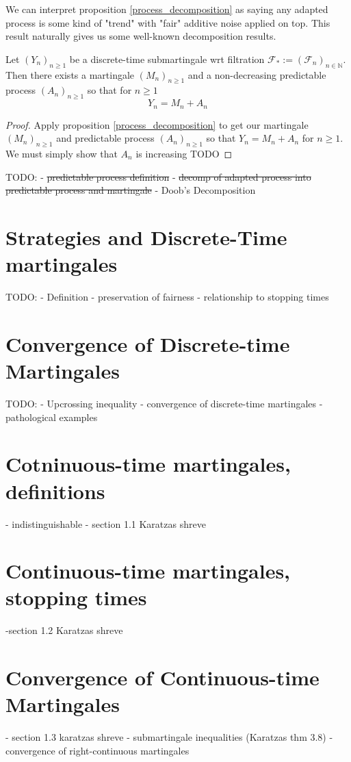 We can interpret proposition \ref{process_decomposition} as saying any adapted process is some kind of "trend" with "fair" additive noise applied on top. This result naturally gives us some well-known decomposition results.

\begin{corollary}
    \label{doob_decomposition}
    Let $(Y_{n})_{n \geq 1}$ be a discrete-time submartingale wrt filtration $\mathcal{F}_{*} := (\mathcal{F}_{n})_{n \in \mathbb{N}}$. Then there exists a martingale \((M_{n})_{n \geq 1}\) and a non-decreasing predictable process \((A_{n})_{n \geq 1}\) so that for \(n \geq 1\)
    \[Y_{n} = M_{n} + A_{n}\]
\end{corollary}

\begin{proof}
    Apply proposition \ref{process_decomposition} to get our martingale \((M_{n})_{n \geq 1}\) and predictable process \((A_{n})_{n \geq 1}\) so that \(Y_{n} = M_{n} + A_{n}\) for \(n \geq 1\). We must simply show that \(A_{n}\) is increasing TODO
\end{proof}


TODO: 
- \st{predictable process definition}
- \st{decomp of adapted process into predictable process and martingale}
- Doob's Decomposition

\section{Strategies and Discrete-Time martingales}
TODO:
- Definition
- preservation of fairness
- relationship to stopping times

\section{Convergence of Discrete-time Martingales}

TODO:
- Upcrossing inequality
- convergence of discrete-time martingales
- pathological examples

\section{Cotninuous-time martingales, definitions}
- indistinguishable
- section 1.1 Karatzas shreve

\section{Continuous-time martingales, stopping times}
-section 1.2 Karatzas shreve

\section{Convergence of Continuous-time Martingales}
- section 1.3 karatzas shreve
- submartingale inequalities (Karatzas thm 3.8)
- convergence of right-continuous martingales